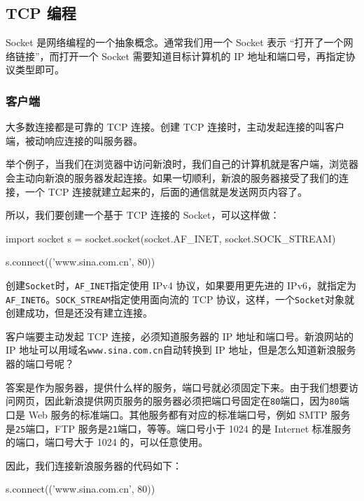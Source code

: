 \hypertarget{tcp-ux7f16ux7a0b}{%
\subsection{TCP 编程}\label{tcp-ux7f16ux7a0b}}

Socket 是网络编程的一个抽象概念。通常我们用一个 Socket 表示
``打开了一个网络链接''，而打开一个 Socket 需要知道目标计算机的 IP
地址和端口号，再指定协议类型即可。

\hypertarget{ux5ba2ux6237ux7aef}{%
\subsubsection{客户端}\label{ux5ba2ux6237ux7aef}}

大多数连接都是可靠的 TCP 连接。创建 TCP
连接时，主动发起连接的叫客户端，被动响应连接的叫服务器。

举个例子，当我们在浏览器中访问新浪时，我们自己的计算机就是客户端，浏览器会主动向新浪的服务器发起连接。如果一切顺利，新浪的服务器接受了我们的连接，一个
TCP 连接就建立起来的，后面的通信就是发送网页内容了。

所以，我们要创建一个基于 TCP 连接的 Socket，可以这样做：

\begin{pythoncode}
import socket
s = socket.socket(socket.AF_INET, socket.SOCK_STREAM)

s.connect(('www.sina.com.cn', 80))
\end{pythoncode}

创建\texttt{Socket}时，\texttt{AF\_INET}指定使用 IPv4
协议，如果要用更先进的
IPv6，就指定为\texttt{AF\_INET6}。\texttt{SOCK\_STREAM}指定使用面向流的
TCP 协议，这样，一个\texttt{Socket}对象就创建成功，但是还没有建立连接。

客户端要主动发起 TCP 连接，必须知道服务器的 IP 地址和端口号。新浪网站的
IP 地址可以用域名\texttt{www.sina.com.cn}自动转换到 IP
地址，但是怎么知道新浪服务器的端口号呢？

答案是作为服务器，提供什么样的服务，端口号就必须固定下来。由于我们想要访问网页，因此新浪提供网页服务的服务器必须把端口号固定在\texttt{80}端口，因为\texttt{80}端口是
Web 服务的标准端口。其他服务都有对应的标准端口号，例如 SMTP
服务是\texttt{25}端口，FTP 服务是\texttt{21}端口，等等。端口号小于 1024
的是 Internet 标准服务的端口，端口号大于 1024 的，可以任意使用。

因此，我们连接新浪服务器的代码如下：

\begin{pythoncode}
s.connect(('www.sina.com.cn', 80))
\end{pythoncode}

